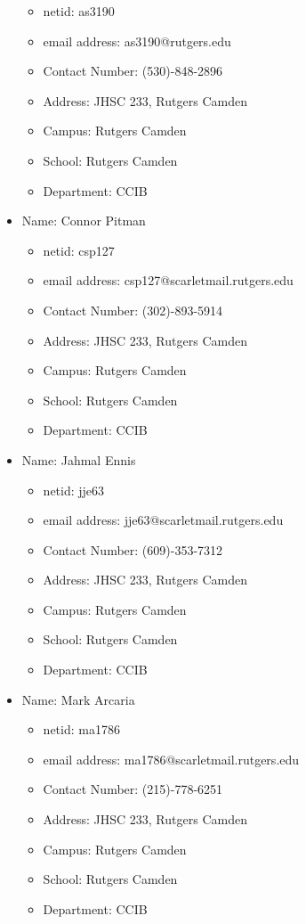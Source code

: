 \documentclass[oneside]{report}
\begin{document}
\begin{itemize}
	    \begin{itemize}               
			\item netid: as3190
                    	\item email address: as3190@rutgers.edu
                    	\item Contact Number: (530)-848-2896
                    	\item Address: JHSC 233, Rutgers Camden
                    	\item Campus: Rutgers Camden
                    	\item School: Rutgers Camden
                    	\item Department: CCIB
	    \end{itemize}
	    \item Name: Connor Pitman
	    \begin{itemize}               
			\item netid: csp127
                    	\item email address: csp127@scarletmail.rutgers.edu
                    	\item Contact Number: (302)-893-5914
                    	\item Address: JHSC 233, Rutgers Camden
                    	\item Campus: Rutgers Camden
                    	\item School: Rutgers Camden
                    	\item Department: CCIB
	    \end{itemize}
	    \item Name: Jahmal Ennis
	    \begin{itemize}               
			\item netid: jje63
                    	\item email address: jje63@scarletmail.rutgers.edu
                    	\item Contact Number: (609)-353-7312
                    	\item Address: JHSC 233, Rutgers Camden
                    	\item Campus: Rutgers Camden
                    	\item School: Rutgers Camden
                    	\item Department: CCIB
	    \end{itemize}
	    \item Name: Mark Arcaria
	    \begin{itemize}               
			\item netid: ma1786
                    	\item email address: ma1786@scarletmail.rutgers.edu
                    	\item Contact Number: (215)-778-6251
                    	\item Address: JHSC 233, Rutgers Camden
                    	\item Campus: Rutgers Camden
                    	\item School: Rutgers Camden
                    	\item Department: CCIB
	    \end{itemize}

    \end{itemize}
\printbibliography
\end{document}
